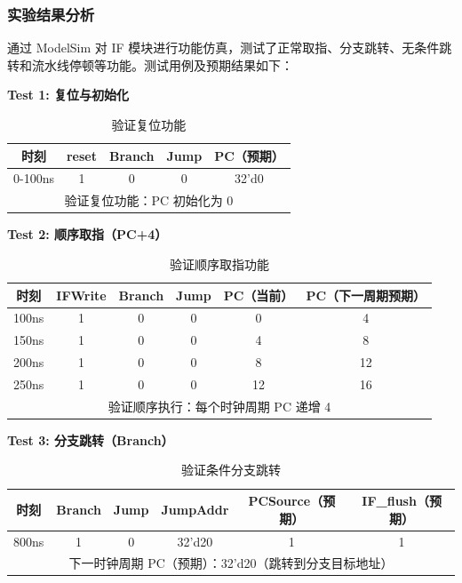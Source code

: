 \documentclass[12pt,a4paper]{article}
\begin{document}
\subsubsection{实验结果分析}

通过 ModelSim 对 IF 模块进行功能仿真，测试了正常取指、分支跳转、无条件跳转和流水线停顿等功能。测试用例及预期结果如下：

\textbf{Test 1: 复位与初始化}

\begin{table}[H]
\centering
\begin{tabular}{|c|c|c|c|c|}
\hline
时刻 & reset & Branch & Jump & PC（预期） \\ \hline
0-100ns & 1 & 0 & 0 & 32'd0 \\ \hline
\multicolumn{5}{|c|}{验证复位功能：PC 初始化为 0} \\ \hline
\end{tabular}
\caption{验证复位功能}
\end{table}

\textbf{Test 2: 顺序取指（PC+4）}

\begin{table}[H]
\centering
\begin{tabular}{|c|c|c|c|c|c|}
\hline
时刻 & IFWrite & Branch & Jump & PC（当前） & PC（下一周期预期） \\ \hline
100ns & 1 & 0 & 0 & 0 & 4 \\ \hline
150ns & 1 & 0 & 0 & 4 & 8 \\ \hline
200ns & 1 & 0 & 0 & 8 & 12 \\ \hline
250ns & 1 & 0 & 0 & 12 & 16 \\ \hline
\multicolumn{6}{|c|}{验证顺序执行：每个时钟周期 PC 递增 4} \\ \hline
\end{tabular}
\caption{验证顺序取指功能}
\end{table}

\textbf{Test 3: 分支跳转（Branch）}

\begin{table}[H]
\centering
\begin{tabular}{|c|c|c|c|c|c|}
\hline
时刻 & Branch & Jump & JumpAddr & PCSource（预期） & IF\_flush（预期） \\ \hline
800ns & 1 & 0 & 32'd20 & 1 & 1 \\ \hline
\multicolumn{6}{|c|}{下一时钟周期 PC（预期）：32'd20（跳转到分支目标地址）} \\ \hline
\end{tabular}
\caption{验证条件分支跳转}
\end{table}
\end{document}
